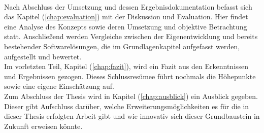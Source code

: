     \\
    \linebreak
    Nach Abschluss der Umsetzung und dessen Ergebnisdokumentation befasst sich das Kapitel (\ref{chap:evaluation}) mit der Diskussion 
    und Evaluation. Hier findet eine Analyse des Konzepts sowie deren Umsetzung und objektive Betrachtung statt. Anschließend werden 
    Vergleiche zwischen der Eigenentwicklung und bereits bestehender Softwarelösungen, die im Grundlagenkapitel aufgefasst werden, 
    aufgestellt und bewertet. %
    \\
    \linebreak
    Im vorletzten Teil, Kapitel (\ref{chap:fazit}), wird ein Fazit aus den Erkenntnissen und Ergebnissen gezogen. Dieses Schlussresümee 
    führt nochmals die Höhepunkte sowie eine eigene Einschätzung auf. 
    \\
    \linebreak
    Zum Abschluss der Thesis wird in Kapitel (\ref{chap:ausblick}) ein Ausblick gegeben. Dieser gibt Aufschluss darüber, welche 
    Erweiterungsmöglichkeiten es für die in dieser Thesis erfolgten Arbeit gibt und wie innovativ sich dieser Grundbaustein in Zukunft 
    erweisen könnte. 

